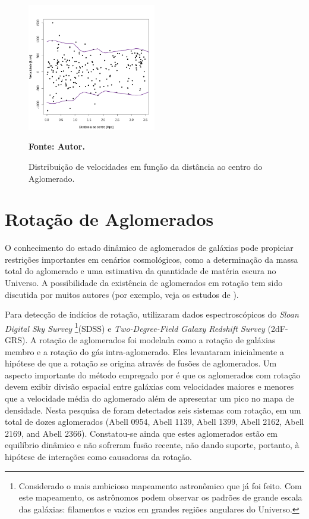 \begin{figure}[H]
	\centering
	\includegraphics[width=0.5\textwidth]{04-figuras/10043}
	\caption{Distribuição de velocidades em função da distância ao centro do Aglomerado.}
	\textbf{Fonte: Autor.}
	\label{fig2}
\end{figure}

\chapter{Rotação de Aglomerados}

O conhecimento do estado dinâmico de aglomerados de galáxias pode propiciar restrições importantes em cenários cosmológicos, como a determinação da massa total do aglomerado e uma estimativa da quantidade de matéria escura no Universo. A possibilidade da existência de aglomerados em rotação tem sido discutida por muitos autores (por exemplo, veja os estudos de \cite{hwang2007searching, manolopoulou2016galaxy}). 

Para detecção de indícios de rotação,  utilizaram dados espectroscópicos do \textit{Sloan Digital Sky Survey} \footnote{Considerado o mais ambicioso mapeamento astronômico que já foi feito. Com este mapeamento, os astrônomos podem observar os padrões de grande escala das galáxias: filamentos e vazios em grandes regiões angulares do Universo.}(SDSS) e \textit{Two-Degree-Field Galaxy Redshift Survey} (2dF-GRS). A rotação de aglomerados foi modelada como a rotação de galáxias membro e a rotação do gás intra-aglomerado. Eles levantaram inicialmente a hipótese de que a rotação se origina através de fusões de aglomerados. Um aspecto importante do método empregado por  é que os aglomerados com rotação devem exibir divisão espacial entre galáxias com velocidades maiores e menores que a velocidade média do aglomerado além de apresentar um pico no mapa de densidade. Nesta pesquisa de  foram detectados seis sistemas com rotação, em um total de dozes aglomerados (Abell 0954, Abell 1139, Abell 1399, Abell 2162, Abell 2169, and Abell 2366). Constatou-se ainda que estes aglomerados estão em equilíbrio dinâmico e não sofreram fusão recente, não dando suporte, portanto, à hipótese de interações como causadoras da rotação. 

